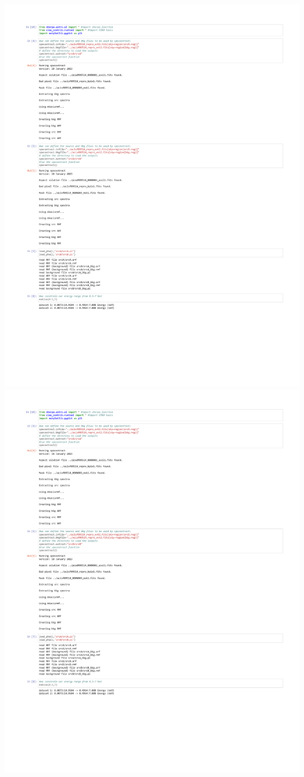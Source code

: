 \documentclass[12pt]{report}
\begin{document}
\includegraphics[scale=0.75,page=1]{Images/blake_src1.pdf}
\includegraphics[scale=0.75,page=2]{Images/blake_src1.pdf}
\end{document}
